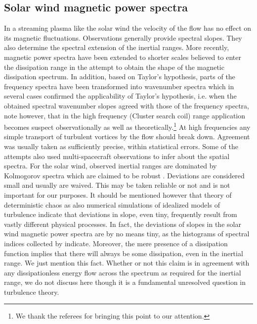 \documentclass[ ]{copernicus2}
\begin{document}
{{{\subsection{Solar wind magnetic power spectra}
{In a streaming plasma like the solar wind the velocity of the flow has no effect on its magnetic fluctuations. Observations generally provide spectral slopes. They also determine the spectral extension of the inertial ranges. More recently, magnetic power spectra have been extended to shorter scales believed to enter the dissipation range in the attempt to obtain the shape of the magnetic dissipation spectrum. In addition, based on Taylor's hypothesis, parts of the frequency spectra have been transformed into wavenumber spectra which in several cases confirmed the applicability of Taylor's hypothesis, i.e. when the obtained spectral wavenumber slopes agreed with those of the frequency spectra, {note however, that in the high frequency (Cluster search coil) range application becomes suspect observationally as well as theoretically.}\footnote{{We thank the referees for bringing this point to our attention.}} {At high frequencies any simple transport of turbulent vortices by the flow should break down.} Agreement was usually taken as sufficiently precise, within statistical errors. Some of the attempts also used multi-spacecraft observations to infer about the spatial spectra. For the solar wind, observed inertial ranges are dominated by Kolmogorov spectra which are claimed to be robust {\citep[cf.][for well founded arguments]{podesta2006}.} Deviations are considered small and usually are waived. This may be taken reliable or not and is not important for our purposes. It should be mentioned however that theory of deterministic chaos as also numerical simulations of idealized models of turbulence indicate that deviations in slope, even tiny, frequently result from vastly different {physical} processes. In fact, the deviations of slopes in the solar wind magnetic power spectra are by no means tiny, as the histograms of spectral indices collected by \citet[][their Fig.2]{chen2011} indicate. Moreover, the mere presence of a dissipation function implies that there will always be some dissipation, even in the inertial range. We just mention this fact. Whether or not this claim is in agreement with any dissipationless energy flow across the spectrum as required for the inertial range, we do not discuss here though it is a fundamental unresolved question in turbulence theory.}

}}}
\end{document}
